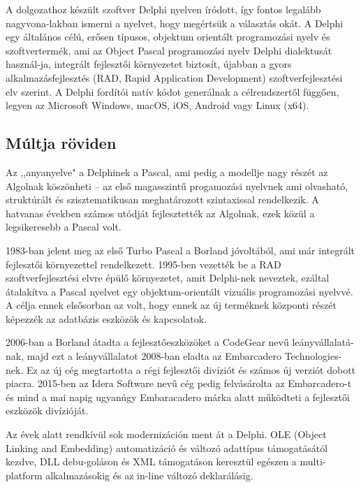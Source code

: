 
A dolgozathoz készült szoftver Delphi nyelven íródott, így fontos legalább nagyvona\hyp{}lakban ismerni a nyelvet, hogy megértsük a választás okát.
A Delphi egy általános célú, erősen típusos, objektum orientált programozási nyelv és szoftvertermék, ami az Object Pascal programozási nyelv Delphi dialektusát használ\hyp{}ja, integrált fejlesztői környezetet biztosít, újabban a gyors alkalmazásfejlesztés (RAD, Rapid Application Development) szoftverfejlesztési elv szerint. A Delphi fordítói natív kódot generálnak a célrendszertől függően, legyen az Microsoft Windows, macOS, iOS, Android vagy Linux (x64).

\textit{\cite{delphi:001}}

\subsection{Múltja röviden}
Az ,,anyanyelve" a Delphinek a Pascal, ami pedig a modellje nagy részét az Algolnak köszönheti -- az első magasszintű progamozási nyelvnek ami olvasható, struktúrált és szisztematikusan meghatározott szintaxissal rendelkezik. A hatvanas években számos utódját fejlesztették az Algolnak, ezek közül a legsikeresebb a Pascal volt.

1983-ban jelent meg az első Turbo Pascal a Borland jóvoltából, ami már integrált fejlesztői környezettel rendelkezett. 1995-ben vezették be a RAD szoftverfejlesztési elvre épülő környezetet, amit Delphi-nek neveztek, ezáltal átalakítva a Pascal nyelvet egy objektum-orientált vizuális programozási nyelvvé. A célja ennek elsősorban az volt, hogy ennek az új terméknek központi részét képezzék az adatbázis eszközök és kapcsolatok.

2006-ban a Borland átadta a fejlesztőeszközöket a CodeGear nevű leányvállalatá\hyp{}nak, majd ezt a leányvállalatot 2008-ban eladta az Embarcadero Technologies-nek. Ez az új cég megtartotta a régi fejlesztői divíziót és számos új verziót dobott piacra. 2015-ben az Idera Software nevű cég pedig felvásárolta az Embarcadero-t és mind a mai napig ugyanúgy Embaracadero márka alatt működteti a fejlesztői eszközök divízióját.

Az évek alatt rendkívül sok modernizáción ment át a Delphi. OLE (Object Linking and Embedding) automatizáció és változó adattípus támogatásától kezdve, DLL debu\hyp{}goláson és XML támogatáson keresztül egészen a multi-platform alkalmazásokig és az in-line változó deklarálásig.

\textit{\cite{delphi:002}}

